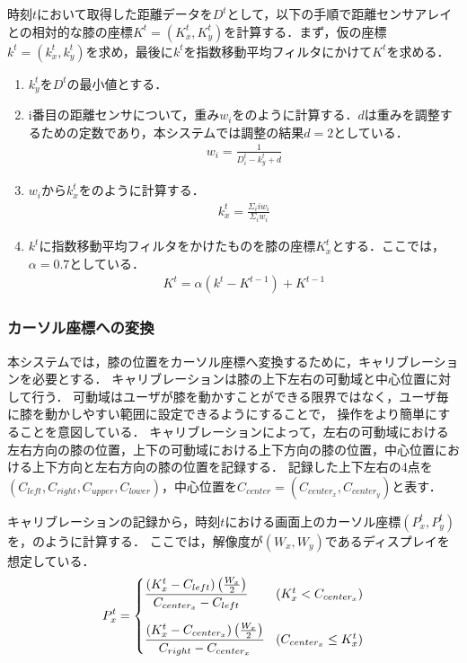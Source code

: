 \documentclass[submit, techrep]{ipsj}
\begin{document}
時刻$t$において取得した距離データを$D^t$として，以下の手順で距離センサアレイとの相対的な膝の座標$K^t=(K^t_x, K^t_y)$を計算する．まず，仮の座標$k^t=(k^t_x, k^t_y)$を求め，最後に$k^t$を指数移動平均フィルタにかけて$K^t$を求める．
\begin{enumerate}
	\item $k^t_y$を$D^t$の最小値とする．
	\item i番目の距離センサについて，重み$w_i$をのように計算する．$d$は重みを調整するための定数であり，本システムでは調整の結果$d=2$としている．
	\begin{eqnarray}
		\label{eq:weight}
		w_i = \frac{1}{D^t_i - k^t_y + d}
	\end{eqnarray}
	\item $w_i$から$k^t_x$をのように計算する．
	\begin{eqnarray}
		\label{eq:calc_x}
			k^t_x = \frac{\Sigma_i iw_i}{\Sigma_i w_i}
	\end{eqnarray}
	\item $k^t$に指数移動平均フィルタをかけたものを膝の座標$K^t_x$とする．ここでは，$\alpha=0.7$としている．
\begin{eqnarray}
	\label{eq:filter}
	K^t = \alpha (k^t - K^{t-1}) + K^{t-1}
	\end{eqnarray}
\end{enumerate}
\subsubsection{カーソル座標への変換}
本システムでは，膝の位置をカーソル座標へ変換するために，キャリブレーションを必要とする．
キャリブレーションは膝の上下左右の可動域と中心位置に対して行う．
可動域はユーザが膝を動かすことができる限界ではなく，ユーザ毎に膝を動かしやすい範囲に設定できるようにすることで，
操作をより簡単にすることを意図している．
キャリブレーションによって，左右の可動域における左右方向の膝の位置，上下の可動域における上下方向の膝の位置，中心位置における上下方向と左右方向の膝の位置を記録する．
記録した上下左右の4点を$(C_{left},C_{right},C_{upper},C_{lower})$，中心位置を$C_{center}=(C_{center_x},  C_{center_y})$と表す．\par
キャリブレーションの記録から，時刻$t$における画面上のカーソル座標$(P^t_x, P^t_y)$を，のように計算する．
ここでは，解像度が$(W_x, W_y)$であるディスプレイを想定している．
\begin{eqnarray}
	\label{eq:calc_px1}
	P^t_x = 
	\begin{cases}
	
			\cfrac{(K^t_x - C_{left}) \left( \frac{W_x}{2} \right)}{C_{center_x} - C_{left}} & (K^t_x < C_{center_x}) 
			\vspace{10pt} \\	
			\cfrac{(K^t_x - C_{center_x}) \left( \frac{W_x}{2} \right)}{C_{right} - C_{center_x}} & (C_{center_x} \leq K^t_x) 
	\end{cases}
\end{eqnarray}
\end{document}
